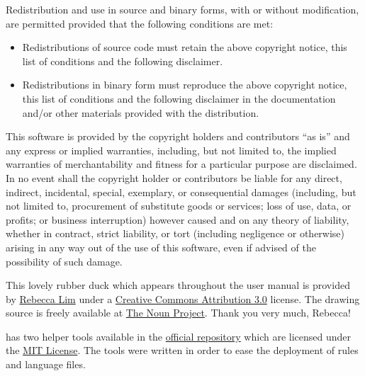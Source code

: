 \documentclass[a4paper,twoside,12pt]{memoir}
\begin{document}
\vspace{1em}

\noindent Redistribution and use in source and binary forms, with or without modification, are permitted provided that the following conditions are met:

\begin{itemize}
\item Redistributions of source code must retain the above copyright notice, this list of conditions and the following disclaimer.
\item Redistributions in binary form must reproduce the above copyright notice, this list of conditions and the following disclaimer in the documentation and/or other materials provided with the distribution.
\end{itemize}

\noindent This software is provided by the copyright holders and contributors ``as is'' and any express or implied warranties, including, but not limited to, the implied warranties of merchantability and fitness for a particular purpose are disclaimed. In no event shall the copyright holder or contributors be liable for any direct, indirect, incidental, special, exemplary, or consequential damages (including, but not limited to, procurement of substitute goods or services; loss of use, data, or profits; or business interruption) however caused and on any theory of liability, whether in contract, strict liability, or tort (including negligence or otherwise) arising in any way out of the use of this software, even if advised of the possibility of such damage.

\ornamentline

\begin{center}
\rubberduck
\end{center}

\noindent This lovely rubber duck which appears throughout the \arara user manual is provided by \href{http://reblim.com}{Rebecca Lim} under a \href{https://creativecommons.org/licenses/by/3.0/us/}{Creative Commons Attribution 3.0} license. The drawing source is freely available at \href{https://thenounproject.com/term/rubber-duck/25368/}{The Noun Project}. Thank you very much, Rebecca!

\ornamentline

\vspace{1em}

\noindent\arara has two helper tools available in the \href{https://github.com/cereda/arara}{official repository} which are licensed under the \href{http://opensource.org/licenses/MIT}{MIT License}. The tools were written in order to ease the deployment of rules and language files.
\end{document}
